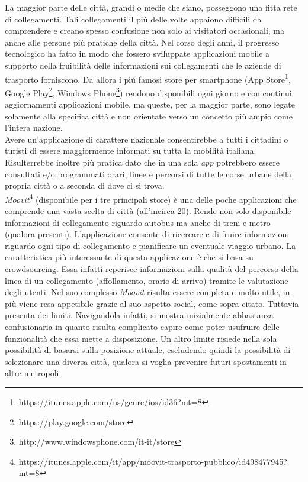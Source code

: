 La maggior parte delle citt\`{a}, grandi o medie che siano, posseggono una fitta rete di collegamenti. Tali collegamenti il pi\`{u} delle volte appaiono difficili da comprendere e creano spesso confusione non solo ai visitatori occasionali, ma anche alle persone pi\`{u} pratiche della citt\`{a}. Nel corso degli anni, il progresso tecnologico ha fatto in modo che fossero sviluppate applicazioni mobile a supporto della fruibilit\`{a} delle informazioni sui collegamenti che le aziende di trasporto forniscono. 
Da allora i pi\`{u} famosi store per smartphone (App Store\footnote{https://itunes.apple.com/us/genre/ios/id36?mt=8}, Google Play\footnote{https://play.google.com/store}, Windows Phone\footnote{http://www.windowsphone.com/it-it/store}) rendono disponibili ogni giorno e con continui aggiornamenti applicazioni mobile, ma queste, per la maggior parte, sono legate solamente alla specifica citt\`{a} e non orientate verso un concetto pi\`{u} ampio come l\rq intera nazione.\\ 
Avere un\rq applicazione di carattere nazionale consentirebbe a tutti i cittadini o turisti di essere maggiormente informati su tutta la mobilit\`{a} italiana. Risulterrebbe inoltre pi\`{u} pratica dato che in una sola \emph{app} potrebbero essere consultati e/o programmati orari, linee e percorsi di tutte le corse urbane della propria citt\`{a} o a seconda di dove ci si trova.\\
\emph{Moovit}\footnote{https://itunes.apple.com/it/app/moovit-trasporto-pubblico/id498477945?mt=8} (disponibile per i tre principali store) \`{e} una delle poche applicazioni che comprende una vasta scelta di citt\`{a} (all\rq incirca 20). Rende non solo disponibile informazioni di collegamento riguardo autobus ma anche di treni e metro (qualora presenti). L\rq applicazione consente di ricercare e di fruire informazioni riguardo ogni tipo di collegamento e pianificare un eventuale viaggio urbano. 
La caratteristica pi\`{u} interessante di questa applicazione \`{e} che si basa su crowdsourcing. Essa infatti reperisce informazioni sulla qualit\`{a} del percorso della linea di un collegamento (affollamento, orario di arrivo) tramite le valutazione degli utenti. 
Nel suo complesso \emph{Moovit} risulta essere completa e molto utile, in pi\`{u} viene resa appetibile grazie al suo aspetto social, come sopra citato. Tuttavia presenta dei limiti. Navigandola infatti, si mostra inizialmente abbastanza confusionaria in quanto risulta complicato capire come poter usufruire delle funzionalit\`{a} che essa mette a disposizione. Un altro limite risiede nella sola possibilit\`{a} di basarsi sulla posizione attuale, escludendo quindi la possibilit\`{a} di selezionare una diversa citt\`{a}, qualora si voglia prevenire futuri spostamenti in altre metropoli.
